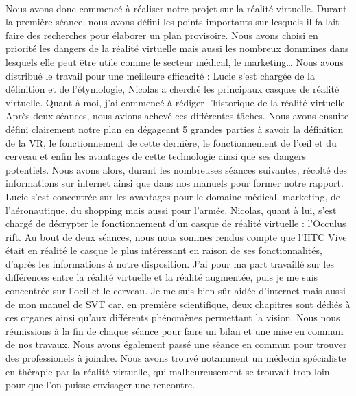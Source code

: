 \documentclass[11pt, a4paper]{article}
\begin{document}
\paragraph*{} Nous avons donc commencé à réaliser notre projet sur la réalité virtuelle. Durant la première séance, nous avons défini les points importants sur lesquels il fallait faire des recherches pour élaborer un plan provisoire. Nous avons choisi en priorité les dangers de la réalité virtuelle mais aussi les nombreux dommines dans lesquels elle peut être utile comme le secteur médical, le marketing\ldots{}
Nous avons distribué le travail pour une meilleure efficacité : Lucie s'est chargée de la définition et de l'étymologie, Nicolas a cherché les principaux casques de réalité virtuelle. Quant à moi, j'ai commencé à rédiger l'historique de la réalité virtuelle. Après deux séances, nous avions achevé ces différentes tâches. Nous avons ensuite défini clairement notre plan en dégageant 5 grandes parties à savoir la définition de la VR, le fonctionnement de cette dernière, le fonctionnement de l'\oe{}il et du cerveau et enfin les avantages de cette technologie ainsi que ses dangers potentiels. Nous avons alors, durant les nombreuses séances suivantes, récolté des informations sur internet ainsi que dans nos manuels pour former notre rapport. Lucie s'est concentrée sur les avantages pour le domaine médical, marketing, de l'aéronautique, du shopping mais aussi pour l'armée. Nicolas, quant à lui, s'est chargé de décrypter le fonctionnement d'un casque de réalité virtuelle : l'Occulus rift. Au bout de deux séances, nous nous sommes rendus compte que l'HTC Vive était en réalité le casque le plus intéressant en raison de ses fonctionnalités, d'après les informations à notre disposition. J'ai pour ma part travaillé sur les différences entre la réalité virtuelle et la réalité augmentée, puis je me suis concentrée sur l'oeil et le cerveau. Je me suis bien-sûr aidée d'internet mais aussi de mon manuel de SVT car, en première scientifique, deux chapitres sont dédiés à ces organes ainsi qu'aux différents phénomènes permettant la vision. Nous nous réunissions à la fin de chaque séance pour faire un bilan et une mise en commun de nos travaux. Nous avons également passé une séance en commun pour trouver des professionels à joindre. Nous avons trouvé notamment un médecin spécialiste en thérapie par la réalité virtuelle, qui malheureusement se trouvait trop loin pour que l'on puisse envisager une rencontre.
\end{document}
